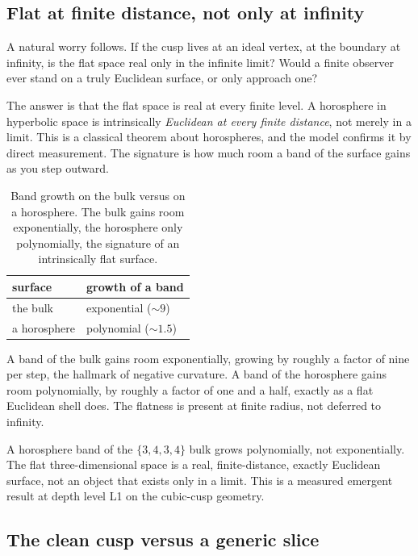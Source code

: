 \subsection{Flat at finite distance, not only at infinity}

A natural worry follows. If the cusp lives at an ideal vertex, at the boundary at infinity, is the flat space real only in the infinite limit? Would a finite observer ever stand on a truly Euclidean surface, or only approach one?

The answer is that the flat space is real at every finite level. A horosphere in hyperbolic space is intrinsically \emph{Euclidean at every finite distance}, not merely in a limit. This is a classical theorem about horospheres, and the model confirms it by direct measurement. The signature is how much room a band of the surface gains as you step outward.

\begin{table}[ht]
\centering
\begin{tabular}{@{}ll@{}}
\toprule
surface & growth of a band \\
\midrule
the bulk & exponential ($\sim 9$) \\
a horosphere & polynomial ($\sim 1.5$) \\
\bottomrule
\end{tabular}
\caption{Band growth on the bulk versus on a horosphere. The bulk gains room exponentially, the horosphere only polynomially, the signature of an intrinsically flat surface.}
\label{tab:band-growth}
\end{table}

A band of the bulk gains room exponentially, growing by roughly a factor of nine per step, the hallmark of negative curvature. A band of the horosphere gains room polynomially, by roughly a factor of one and a half, exactly as a flat Euclidean shell does. The flatness is present at finite radius, not deferred to infinity.

\begin{result}
A horosphere band of the $\{3,4,3,4\}$ bulk grows polynomially, not exponentially. The flat three-dimensional space is a real, finite-distance, exactly Euclidean surface, not an object that exists only in a limit. This is a measured emergent result at depth level L1 on the cubic-cusp geometry.
\end{result}

\subsection{The clean cusp versus a generic slice}


